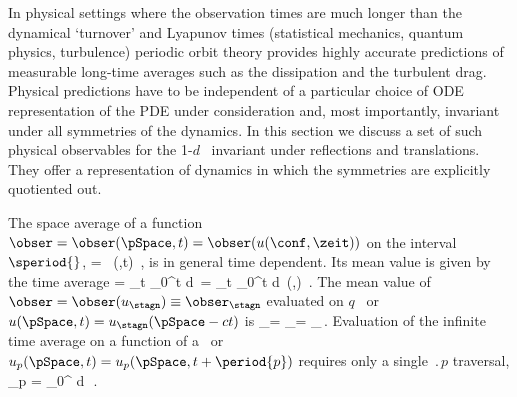 



In physical settings where the observation times are much
longer than the dynamical `turnover' and Lyapunov times
(statistical mechanics, quantum physics, turbulence) periodic
orbit theory provides highly accurate predictions
of measurable long-time averages such as the dissipation and
the turbulent drag. Physical predictions have to
be independent of a particular choice of ODE representation
of the PDE under consideration and, most importantly,
invariant under all symmetries of the dynamics. In this
section we discuss a set of such physical observables for the
1-$d$ \KS\ invariant under reflections and translations. They
offer a representation of dynamics in which the symmetries
are explicitly quotiented out.


The {space average} of a function $\obser = \obser(\pSpace,t) = \obser(u(\conf,\zeit))$  on
the interval $\speriod{}$,
\beq
    \expct{\obser} = \Lint{\pSpace}\, \obser(\pSpace,t)
    \,,
    \label{rpo:spac_ave}
\eeq
is in general time dependent.
Its mean value is given by the {time average}
\beq
\timeAver{\obser}
    =
\lim_{t\rightarrow \infty}  \int_0^t \! d\tau \, \expct{\obser}
    =
\lim_{t\rightarrow \infty}  \int_0^t \!
    \Lint{\tau}  d\pSpace\, \obser(\pSpace,\tau)
    \,.
\label{rpo:tim_ave}
\eeq
The mean value of $\obser = \obser(u_\stagn) \equiv \obser_\stagn$ evaluated on $q$
\eqv\ or {\reqv} $u(\pSpace,t) = u_\stagn(\pSpace-ct)$ is
\beq
\timeAver{\obser}_\stagn = \expct{\obser}_\stagn = \obser_\stagn\,.
\label{rpo:u-eqv} \eeq Evaluation of the infinite time average
 on a function of a \po\ or \rpo\
$u_p(\pSpace,t)=u_p(\pSpace,t+\period{p})$ requires only a single
$\period{p}$ traversal,
\beq
  \timeAver{\obser}_p = 
    \int_0^{\period{p}} \! d\tau \, \expct{\obser}
\,.
\label{rpo:u-cyc}
\eeq

